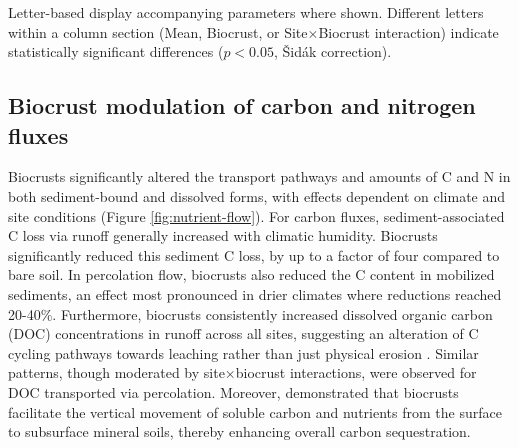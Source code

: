 \begin{table}
\begin{threeparttable}
\begin{tabular*}{\linewidth}
            \bottomrule
        \end{tabular*} %

        \begin{tablenotes}
           \item[a] Letter-based display accompanying parameters where shown. Different letters within a column section (Mean, Biocrust, or Site$\times$Biocrust interaction) indicate statistically significant differences ($p < 0.05$, Šidák correction).
        \end{tablenotes}

    \end{threeparttable}
\end{table} %

\FloatBarrier

\FloatBarrier

\subsection{Biocrust modulation of carbon and nitrogen fluxes}
\label{sec:BiocrustOnNutrientFlows}

Biocrusts significantly altered the transport pathways and amounts of C and N in both sediment-bound and dissolved forms, with effects dependent on climate and site conditions (Figure \ref{fig:nutrient-flow}). For carbon fluxes, sediment-associated C loss via runoff generally increased with climatic humidity. Biocrusts significantly reduced this sediment C loss, by up to a factor of four compared to bare soil. In percolation flow, biocrusts also reduced the C content in mobilized sediments, an effect most pronounced in drier climates where reductions reached 20-40\%. Furthermore, biocrusts consistently increased dissolved organic carbon (DOC) concentrations in runoff across all sites, suggesting an alteration of C cycling pathways towards leaching rather than just physical erosion \citep{Baumert2021}. Similar patterns, though moderated by site$\times$biocrust interactions, were observed for DOC transported via percolation. Moreover, \citet{Young2022} demonstrated that biocrusts facilitate the vertical movement of soluble carbon and nutrients from the surface to subsurface mineral soils, thereby enhancing overall carbon sequestration.  

